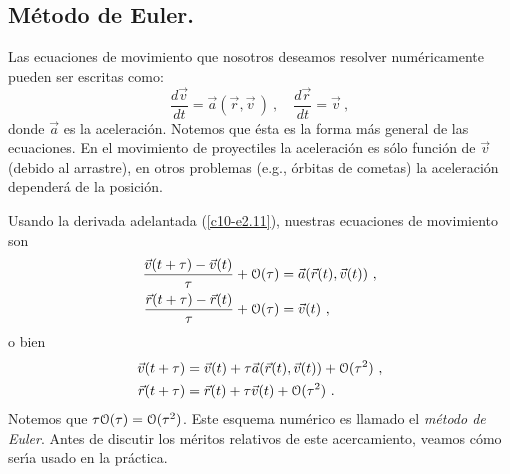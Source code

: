 \subsection{M{\'e}todo de Euler.}

Las ecuaciones de movimiento que nosotros deseamos resolver
num{\'e}ricamente pueden ser escritas como:
\begin{equation}
\label{c10-e2.12}
\frac{d\vec v}{dt}=\vec{a}(\vec r, \vec v\,)\ , \quad \frac{d\vec
  r}{dt}= \vec{v}\ ,
\end{equation}
donde $\vec a$ es la aceleraci{\'o}n. Notemos que \'esta es la forma m{\'a}s
general de las ecuaciones. En el movimiento de proyectiles la
aceleraci{\'o}n es s{\'o}lo funci{\'o}n de $\vec v$ (debido al arrastre), en otros
problemas (e.g., \'orbitas de cometas) la aceleraci{\'o}n depender{\'a} de la
posici{\'o}n.

Usando la derivada adelantada (\ref{c10-e2.11}), nuestras ecuaciones
de movimiento son 
\begin{align}
\label{c10-e2.13}
\frac{\vec v (t+\tau)-\vec v (t)}{\tau} + \EuScript{O}(\tau) &=\vec a(\vec
r(t),\vec v(t)) \ ,\\
\label{c10-e2.14}
\frac{\vec r (t+\tau)-\vec r (t)}{\tau} + \EuScript{O}(\tau) &=\vec v(t) \ , 
\end{align}
o bien
\begin{align}
\label{c10-e2.15}
\vec v (t+\tau) &= \vec v (t) +\tau \vec a(\vec r(t),\vec v(t)) +
\DelOrdenD(\tau^2)\ ,\\
\label{c10-e2.16}
\vec r (t+\tau) &= \vec r (t) +\tau \vec v(t) + \DelOrdenD(\tau^2)\ .
\end{align}
Notemos que $\tau \EuScript{O}(\tau)= \EuScript{O}(\tau^2)$. Este esquema num{\'e}rico
es llamado el {\em m{\'e}todo de Euler}. Antes de discutir los m{\'e}ritos
relativos de este acercamiento, veamos c{\'o}mo ser{\'\i}a usado en la
pr{\'a}ctica.

